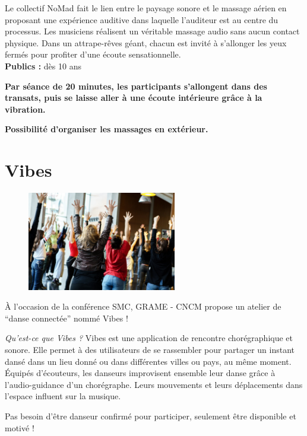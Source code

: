 \documentclass[fontsize=12pt]{scrartcl} %
\numberwithin{equation}{section} %
\numberwithin{table}{section} %
\begin{document}
Le collectif NoMad fait le lien entre le paysage sonore et le massage aérien en proposant une expérience auditive dans laquelle l'auditeur est au centre du processus. Les musiciens réalisent un véritable massage audio sans aucun contact physique. Dans un attrape-rêves géant, chacun est invité à s'allonger les yeux fermés pour profiter d'une écoute sensationnelle.\\

\noindent
\textbf{Publics :} dès 10 ans

\noindent
\textbf{Par séance de 20 minutes, les participants s'allongent  dans des transats, puis se laisse aller à une écoute intérieure grâce à la vibration.}

\noindent
\textbf{Possibilité d'organiser les massages en extérieur.}

\pagebreak

\section{Vibes}
\label{app:vibes}

\begin{figure}
\centering
\includegraphics[width=6.5cm]{img/vibes}
\label{fig:vibes}
\end{figure}

À l'occasion de la conférence SMC, GRAME - CNCM propose un atelier de ``danse connectée'' nommé Vibes !

\textit{Qu'est-ce que Vibes ?}
Vibes est une application de rencontre chorégraphique et sonore. Elle permet à des utilisateurs de se rassembler pour partager un instant dansé dans un lieu donné ou dans différentes villes ou pays, au même moment. Équipés d'écouteurs, les danseurs improvisent ensemble leur danse grâce à l'audio-guidance d'un chorégraphe. Leurs mouvements et leurs déplacements dans l'espace influent sur la musique.

Pas besoin d'être danseur confirmé pour participer, seulement être disponible et motivé !\\
\end{document}
